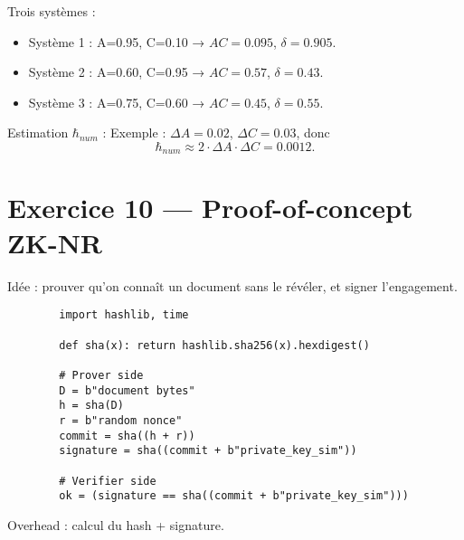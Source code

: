 \documentclass[12pt,a4paper]{article}
\begin{document}
	Trois systèmes :  
	
	\begin{itemize}
		\item Système 1 : A=0.95, C=0.10 → $AC=0.095$, $\delta=0.905$.
		\item Système 2 : A=0.60, C=0.95 → $AC=0.57$, $\delta=0.43$.
		\item Système 3 : A=0.75, C=0.60 → $AC=0.45$, $\delta=0.55$.
	\end{itemize}
	
	Estimation $\hbar_{num}$ :  
	Exemple : $\Delta A=0.02$, $\Delta C=0.03$, donc  
	\[
	\hbar_{num} \approx 2 \cdot \Delta A \cdot \Delta C = 0.0012.
	\]
	
	\section*{Exercice 10 — Proof-of-concept ZK-NR}
	
	Idée : prouver qu’on connaît un document sans le révéler, et signer l’engagement.  
	
	\begin{verbatim}
		import hashlib, time
		
		def sha(x): return hashlib.sha256(x).hexdigest()
		
		# Prover side
		D = b"document bytes"
		h = sha(D)
		r = b"random nonce"
		commit = sha((h + r))
		signature = sha((commit + b"private_key_sim"))
		
		# Verifier side
		ok = (signature == sha((commit + b"private_key_sim")))
	\end{verbatim}
	
	Overhead : calcul du hash + signature.  
	
\end{document}

